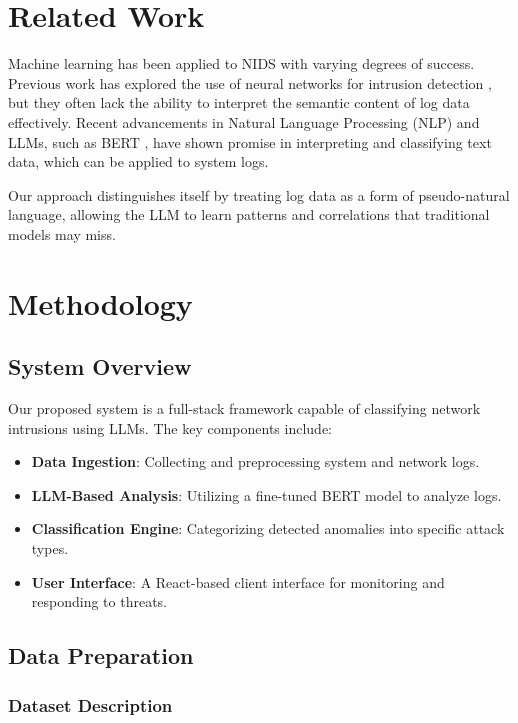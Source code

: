 \documentclass[12pt]{article}
\begin{document}
\section{Related Work}

Machine learning has been applied to NIDS with varying degrees of success. Previous work has explored the use of neural networks for intrusion detection \cite{neuralnids}, but they often lack the ability to interpret the semantic content of log data effectively. Recent advancements in Natural Language Processing (NLP) and LLMs, such as BERT \cite{bert}, have shown promise in interpreting and classifying text data, which can be applied to system logs.

Our approach distinguishes itself by treating log data as a form of pseudo-natural language, allowing the LLM to learn patterns and correlations that traditional models may miss.

\section{Methodology}

\subsection{System Overview}

Our proposed system is a full-stack framework capable of classifying network intrusions using LLMs. The key components include:

\begin{itemize}
    \item \textbf{Data Ingestion}: Collecting and preprocessing system and network logs.
    \item \textbf{LLM-Based Analysis}: Utilizing a fine-tuned BERT model to analyze logs.
    \item \textbf{Classification Engine}: Categorizing detected anomalies into specific attack types.
    \item \textbf{User Interface}: A React-based client interface for monitoring and responding to threats.
\end{itemize}

\subsection{Data Preparation}

\subsubsection{Dataset Description}
\end{document}

